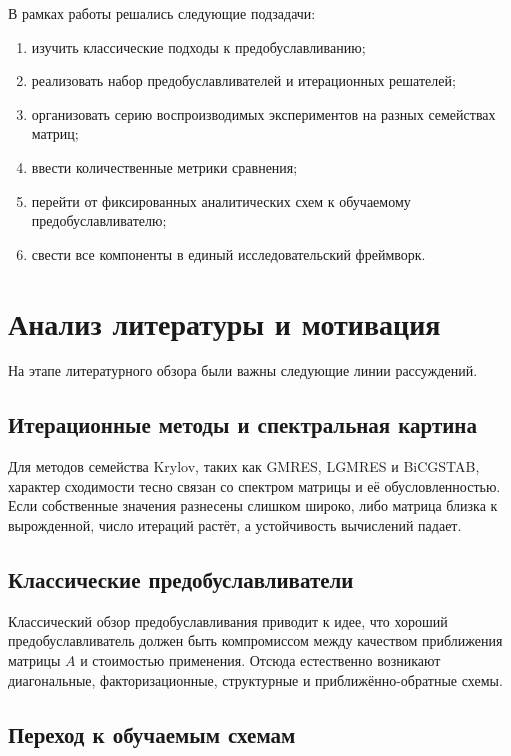 \documentclass[12pt,a4paper]{article}
\begin{document}
В рамках работы решались следующие подзадачи:
\begin{enumerate}[label=\arabic*.]
    \item изучить классические подходы к предобуславливанию;
    \item реализовать набор предобуславливателей и итерационных решателей;
    \item организовать серию воспроизводимых экспериментов на разных семействах матриц;
    \item ввести количественные метрики сравнения;
    \item перейти от фиксированных аналитических схем к обучаемому предобуславливателю;
    \item свести все компоненты в единый исследовательский фреймворк.
\end{enumerate}

\section{Анализ литературы и мотивация}

На этапе литературного обзора были важны следующие линии рассуждений.

\subsection{Итерационные методы и спектральная картина}

Для методов семейства Krylov, таких как GMRES, LGMRES и BiCGSTAB, характер сходимости тесно связан со спектром матрицы и её обусловленностью. Если собственные значения разнесены слишком широко, либо матрица близка к вырожденной, число итераций растёт, а устойчивость вычислений падает.

\subsection{Классические предобуславливатели}

Классический обзор предобуславливания приводит к идее, что хороший предобуславливатель должен быть компромиссом между качеством приближения матрицы $A$ и стоимостью применения. Отсюда естественно возникают диагональные, факторизационные, структурные и приближённо-обратные схемы.

\subsection{Переход к обучаемым схемам}
\end{document}
